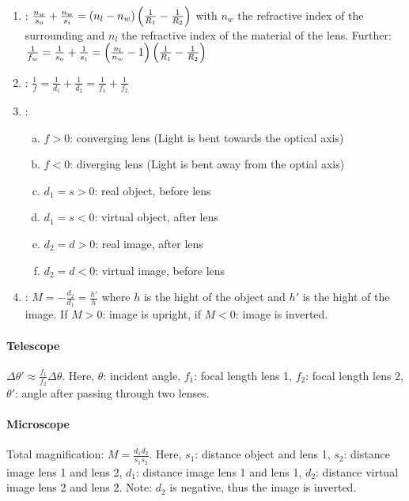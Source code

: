 \begin{enumerate}[]
    \item {}: $\frac{n_w}{s_o} + \frac{n_w}{s_i} = (n_l - n_w) \left( \frac{1}{R_1} - \frac{1}{R_2} \right)$
        with $n_w$ the refractive index of the surrounding and $n_l$ the refractive index
        of the material of the lens. Further: $\frac{1}{f_w} = \frac{1}{s_o} + \frac{1}{s_i}
        = \left( \frac{n_l}{n_w} - 1 \right) \left( \frac{1}{R_1} - \frac{1}{R_2} \right)$
    \item {}: $\frac{1}{f} = \frac{1}{d_1} + \frac{1}{d_2}
        = \frac{1}{f_1} + \frac{1}{f_2}$
    \item {}: \begin{enumerate}[a)]
        \item $f>0$: converging lens (Light is bent towards the optical axis)
        \item $f<0$: diverging lens (Light is bent away from the optial axis)
        \item $d_1 = s>0$: real object, before lens
        \item $d_1 = s<0$: virtual object, after lens
        \item $d_2 = d>0$: real image, after lens
        \item $d_2 = d<0$: virtual image, before lens
    \end{enumerate}
    \item {}: $M = - \frac{d_2}{d_1} = \frac{h'}{h}$ where
        $h$ is the hight of the object and $h'$ is the hight of the image. If
        $M>0$: image is upright, if $M<0$: image is inverted.
\end{enumerate}

\paragraph{Telescope} $\Delta \theta' \approx \frac{f_1}{f_2} \Delta \theta$.
Here, $\theta$: incident angle, $f_1$: focal length lens 1, $f_2$: focal length
lens 2, $\theta'$: angle after passing through two lenses.

\paragraph{Microscope} Total magnification: $M = \frac{d_1 d_2}{s_1 s_2}$.
Here, $s_1$: distance object and lens 1, $s_2$: distance image lens 1 and
lens 2, $d_1$: distance image lens 1 and lens 1, $d_2$: distance virtual image
lens 2 and lens 2. Note: $d_2$ is negative, thus the image is inverted.



